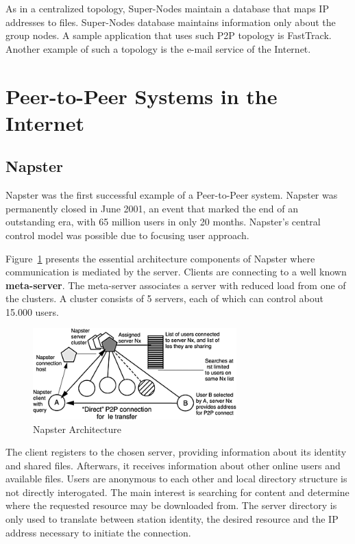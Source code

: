 As in a centralized topology, Super-Nodes maintain a database that maps IP
addresses to files. Super-Nodes database maintains information only about
the group nodes. A sample application that uses such P2P topology is
FastTrack. Another example of such a topology is the e-mail service of the
Internet.

\section{Peer-to-Peer Systems in the Internet}
\label{sec:p2p-systems:p2p-internet}

\subsection{Napster}

Napster was the first successful example of a Peer-to-Peer system. Napster was
permanently closed in June 2001, an event that marked the end of an
outstanding era, with 65 million users in only 20 months. Napster's central
control model was possible due to focusing user approach.

Figure~\ref{fig:p2p-systems:napster} presents the essential architecture
components of Napster where communication is mediated by the server. Clients
are connecting to a well known \textbf{meta-server}. The meta-server
associates a server with reduced load from one of the clusters. A cluster
consists of 5 servers, each of which can control about 15.000 users.

\begin{figure}
  \centering
  \includegraphics[width=0.7\textwidth]{src/img/p2p-systems/napster}
  \caption{Napster Architecture}
  \label{fig:p2p-systems:napster}
\end{figure}

The client registers to the chosen server, providing information about its
identity and shared files. Afterwars, it receives information about other
online users and available files. Users are anonymous to each other and local
directory structure is not directly interogated. The main interest is
searching for content and determine where the requested resource may be
downloaded from.  The server directory is only used to translate between
station identity, the desired resource and the IP address necessary to
initiate the connection.


